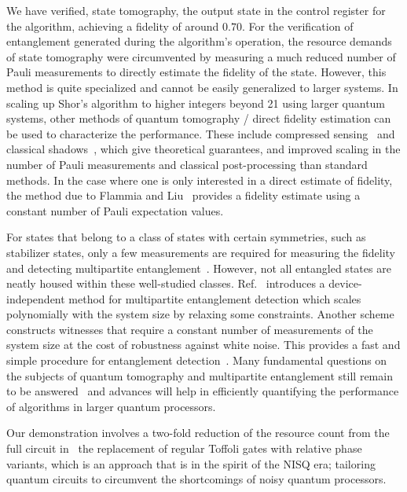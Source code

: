 \bigskip
\noindent
We have verified, \via state tomography, the output state in the control register for the algorithm, achieving a fidelity of around $0.70$. For the verification of entanglement generated during the algorithm's operation, the resource demands of state tomography were circumvented by measuring a much reduced number of Pauli measurements to directly estimate the fidelity of the state. However, this method is quite specialized and cannot be easily generalized to larger systems. In scaling up Shor's algorithm to higher integers beyond 21 using larger quantum systems, other methods of quantum tomography / direct fidelity estimation can be used to characterize the performance. These include compressed sensing~\cite{Gross_2010} and classical shadows~\cite{Huang_2020}, which give theoretical guarantees, and improved scaling in the number of Pauli measurements and classical post-processing than standard methods. In the case where one is only interested in a direct estimate of fidelity, the method due to Flammia and Liu~\cite{Flammia_2011} provides a fidelity estimate using a constant number of Pauli expectation values. 


\bigskip
\noindent
For states that belong to a class of states with certain symmetries, such as stabilizer states, only a few measurements are required for measuring the fidelity and detecting multipartite entanglement~\cite{Toth_2005}. However, not all entangled states are neatly housed within these well-studied classes. Ref.~\cite{Baccari_2017} introduces a device-independent method for multipartite entanglement detection which scales polynomially with the system size by relaxing some constraints. Another scheme constructs witnesses that require a constant number of measurements of the system size at the cost of robustness against white noise. This provides a fast and simple procedure for entanglement detection~\cite{Knips_2016}. Many fundamental questions on the subjects of quantum tomography and multipartite entanglement still remain to be answered~\cite{Banaszek_2013} and advances will help in efficiently quantifying the performance of algorithms in larger quantum processors.


\bigskip
\noindent
Our demonstration involves a two-fold reduction of the resource count from the full circuit in~ \via the replacement of regular Toffoli gates with relative phase variants, which is an approach that is in the spirit of the NISQ era; tailoring quantum circuits to circumvent the shortcomings of noisy quantum processors. 

